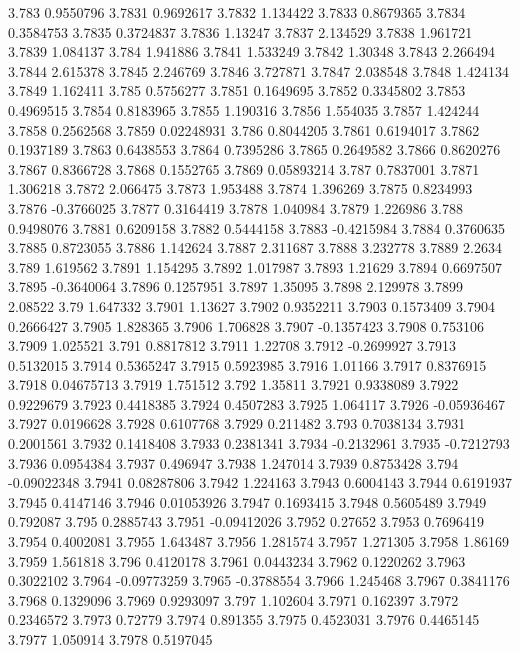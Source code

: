 3.783  0.9550796
3.7831  0.9692617
3.7832  1.134422
3.7833  0.8679365
3.7834  0.3584753
3.7835  0.3724837
3.7836  1.13247
3.7837  2.134529
3.7838  1.961721
3.7839  1.084137
3.784  1.941886
3.7841  1.533249
3.7842  1.30348
3.7843  2.266494
3.7844  2.615378
3.7845  2.246769
3.7846  3.727871
3.7847  2.038548
3.7848  1.424134
3.7849  1.162411
3.785  0.5756277
3.7851  0.1649695
3.7852  0.3345802
3.7853  0.4969515
3.7854  0.8183965
3.7855  1.190316
3.7856  1.554035
3.7857  1.424244
3.7858  0.2562568
3.7859  0.02248931
3.786  0.8044205
3.7861  0.6194017
3.7862  0.1937189
3.7863  0.6438553
3.7864  0.7395286
3.7865  0.2649582
3.7866  0.8620276
3.7867  0.8366728
3.7868  0.1552765
3.7869  0.05893214
3.787  0.7837001
3.7871  1.306218
3.7872  2.066475
3.7873  1.953488
3.7874  1.396269
3.7875  0.8234993
3.7876  -0.3766025
3.7877  0.3164419
3.7878  1.040984
3.7879  1.226986
3.788  0.9498076
3.7881  0.6209158
3.7882  0.5444158
3.7883  -0.4215984
3.7884  0.3760635
3.7885  0.8723055
3.7886  1.142624
3.7887  2.311687
3.7888  3.232778
3.7889  2.2634
3.789  1.619562
3.7891  1.154295
3.7892  1.017987
3.7893  1.21629
3.7894  0.6697507
3.7895  -0.3640064
3.7896  0.1257951
3.7897  1.35095
3.7898  2.129978
3.7899  2.08522
3.79  1.647332
3.7901  1.13627
3.7902  0.9352211
3.7903  0.1573409
3.7904  0.2666427
3.7905  1.828365
3.7906  1.706828
3.7907  -0.1357423
3.7908  0.753106
3.7909  1.025521
3.791  0.8817812
3.7911  1.22708
3.7912  -0.2699927
3.7913  0.5132015
3.7914  0.5365247
3.7915  0.5923985
3.7916  1.01166
3.7917  0.8376915
3.7918  0.04675713
3.7919  1.751512
3.792  1.35811
3.7921  0.9338089
3.7922  0.9229679
3.7923  0.4418385
3.7924  0.4507283
3.7925  1.064117
3.7926  -0.05936467
3.7927  0.0196628
3.7928  0.6107768
3.7929  0.211482
3.793  0.7038134
3.7931  0.2001561
3.7932  0.1418408
3.7933  0.2381341
3.7934  -0.2132961
3.7935  -0.7212793
3.7936  0.0954384
3.7937  0.496947
3.7938  1.247014
3.7939  0.8753428
3.794  -0.09022348
3.7941  0.08287806
3.7942  1.224163
3.7943  0.6004143
3.7944  0.6191937
3.7945  0.4147146
3.7946  0.01053926
3.7947  0.1693415
3.7948  0.5605489
3.7949  0.792087
3.795  0.2885743
3.7951  -0.09412026
3.7952  0.27652
3.7953  0.7696419
3.7954  0.4002081
3.7955  1.643487
3.7956  1.281574
3.7957  1.271305
3.7958  1.86169
3.7959  1.561818
3.796  0.4120178
3.7961  0.0443234
3.7962  0.1220262
3.7963  0.3022102
3.7964  -0.09773259
3.7965  -0.3788554
3.7966  1.245468
3.7967  0.3841176
3.7968  0.1329096
3.7969  0.9293097
3.797  1.102604
3.7971  0.162397
3.7972  0.2346572
3.7973  0.72779
3.7974  0.891355
3.7975  0.4523031
3.7976  0.4465145
3.7977  1.050914
3.7978  0.5197045
